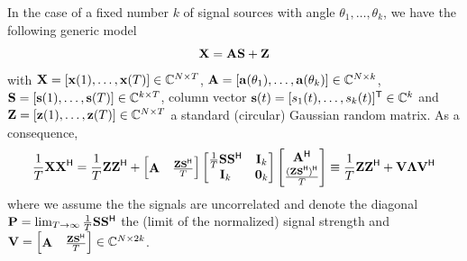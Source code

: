 \documentclass[11pt,a4paper]{article}
\begin{document}
In the case of a fixed number $k$ of signal sources with angle $\theta_1, \ldots, \theta_k$, we have the following generic model
\begin{equation}
	{\mathbf{X}} = {\mathbf{A}} {\mathbf{S}} + {\mathbf{Z}} 
\end{equation}
with ${\mathbf{X}} = [\mathbf{x}(1), \ldots, \mathbf{x}(T)] \in {\mathbb{C}}^{N \times T}$, ${\mathbf{A}} = [\mathbf{a}(\theta_1), \ldots, \mathbf{a}(\theta_k)] \in {\mathbb{C}}^{N \times k}$, ${\mathbf{S}} = [\mathbf{s}(1), \ldots, \mathbf{s}(T)] \in {\mathbb{C}}^{k \times T}$, column vector $\mathbf{s}(t) = [s_1(t), \ldots, s_k(t)]^{\sf T} \in {\mathbb{C}}^k$ and ${\mathbf{Z}} = [\mathbf{z}(1), \ldots, \mathbf{z}(T)] \in {\mathbb{C}}^{N \times T}$ a standard (circular) Gaussian random matrix.
As a consequence,
\begin{equation}
	\frac1T {\mathbf{X}} {\mathbf{X}}^{\sf H} = \frac1T {\mathbf{Z}} {\mathbf{Z}}^{\sf H} + \begin{bmatrix}{\mathbf{A}} & \frac{{\mathbf{Z}} {\mathbf{S}}^{\sf H}}{T}\end{bmatrix} \begin{bmatrix} \frac1T {\mathbf{S}} {\mathbf{S}}^{\sf H} & \mathbf{I}_k \\ \mathbf{I}_k & \mathbf{0}_k \end{bmatrix} \begin{bmatrix} {\mathbf{A}}^{\sf H} \\ \frac{({\mathbf{Z}} {\mathbf{S}}^{\sf H})^{\sf H}}{T}\end{bmatrix} \equiv \frac1T {\mathbf{Z}} {\mathbf{Z}}^{\sf H} + \mathbf{V} \boldsymbol{\Lambda} \mathbf{V}^{\sf H}
\end{equation}
where we assume the the signals are uncorrelated and denote the diagonal $\mathbf{P} = \lim_{T\to \infty} \frac1T {\mathbf{S}} {\mathbf{S}}^{\sf H}$ the (limit of the normalized) signal strength and $\mathbf{V} = \begin{bmatrix}{\mathbf{A}} & \frac{{\mathbf{Z}} {\mathbf{S}}^{\sf H}}{T} \end{bmatrix} \in {\mathbb{C}}^{N \times 2k}$.
\end{document}
